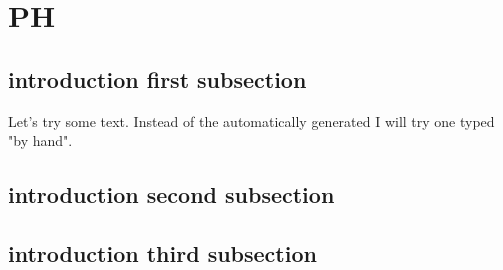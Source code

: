 \documentclass[crop=false]{standalone}
\begin{document}
\section{PH}

\subsection{introduction first subsection}
Let's try some text. Instead of the automatically generated
I will try one typed "by hand".

\subsection{introduction second subsection}


\subsection{introduction third subsection}

\end{document}
